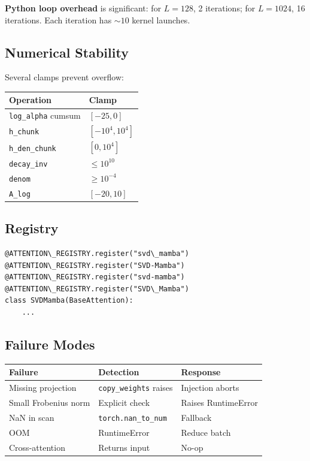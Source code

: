 \textbf{Python loop overhead} is significant: for $L = 128$, 2 iterations; for 
$L = 1024$, 16 iterations. Each iteration has $\sim 10$ kernel launches.

\subsection{Numerical Stability}

Several clamps prevent overflow:

\begin{table}[H]
\centering
\small
\begin{tabular}{ll}
\toprule
\textbf{Operation} & \textbf{Clamp} \\
\midrule
\texttt{log\_alpha} cumsum & $[-25, 0]$ \\
\texttt{h\_chunk} & $[-10^4, 10^4]$ \\
\texttt{h\_den\_chunk} & $[0, 10^4]$ \\
\texttt{decay\_inv} & $\leq 10^{10}$ \\
\texttt{denom} & $\geq 10^{-4}$ \\
\texttt{A\_log} & $[-20, 10]$ \\
\bottomrule
\end{tabular}
\end{table}

\subsection{Registry}

\begin{lstlisting}
@ATTENTION\_REGISTRY.register("svd\_mamba")
@ATTENTION\_REGISTRY.register("SVD-Mamba")
@ATTENTION\_REGISTRY.register("svd-mamba")
@ATTENTION\_REGISTRY.register("SVD\_Mamba")
class SVDMamba(BaseAttention):
    ...
\end{lstlisting}

\subsection{Failure Modes}

\begin{table}[H]
\centering
\small
\begin{tabular}{lll}
\toprule
\textbf{Failure} & \textbf{Detection} & \textbf{Response} \\
\midrule
Missing projection & \texttt{copy\_weights} raises & Injection aborts \\
Small Frobenius norm & Explicit check & Raises RuntimeError \\
NaN in scan & \texttt{torch.nan\_to\_num} & Fallback \\
OOM & RuntimeError & Reduce batch \\
Cross-attention & Returns input & No-op \\
\bottomrule
\end{tabular}
\end{table}

